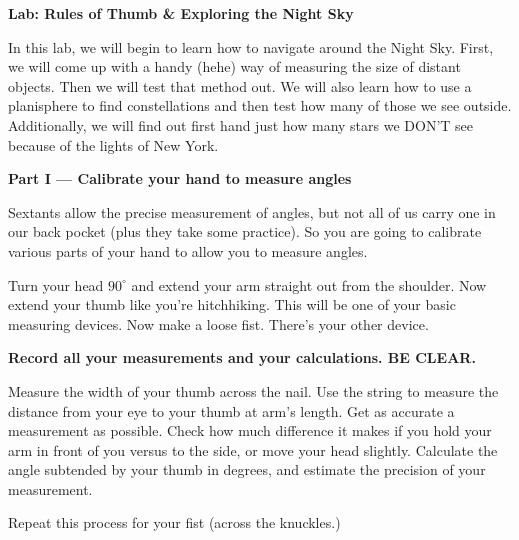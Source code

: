 \documentclass[10pt]{article}%
\begin{document}
\begin{flushleft}
\begin{center}
\Large\textbf{Lab: Rules of Thumb \& Exploring the Night Sky}
\end{center}

\vspace{0.3in}

\large{In this lab, we will begin to learn how to navigate around the Night Sky.  First, we will come up with a handy (hehe) way of measuring the size of distant objects.  Then we will test that method out.  We will also learn how to use a planisphere to find constellations and then test how many of those we see outside.  Additionally, we will find out first hand just how many stars we DON'T see because of the lights of New York.}

\vspace{0.1in}

\large{\textbf{Part I --- Calibrate your hand to measure angles}}

\vspace{0.1in}

Sextants allow the precise measurement of angles, but not all of us
carry one in our back pocket (plus they take some practice). So you
are going to calibrate various parts of your hand to allow you to
measure angles.

\vspace{.1in}

Turn your head $90^\circ$ and extend your arm straight out from the
shoulder. Now extend your thumb like you're hitchhiking. This will be
one of your basic measuring devices. Now make a loose fist. There's
your other device.

\vspace{.1in}

\textbf{Record all your measurements and your calculations.  BE CLEAR.}
\vspace{.1in}

Measure the width of your thumb across the nail. Use the string to
measure the distance from your eye to your thumb at arm's length. Get
as accurate a measurement as possible. Check how much difference it
makes if you hold your arm in front of you versus to the side, or move
your head slightly. Calculate the angle subtended by your thumb in
degrees, and estimate the precision of your measurement.

\vspace{.1in}

Repeat this process for your fist (across the knuckles.)


\end{flushleft}
\end{document}
